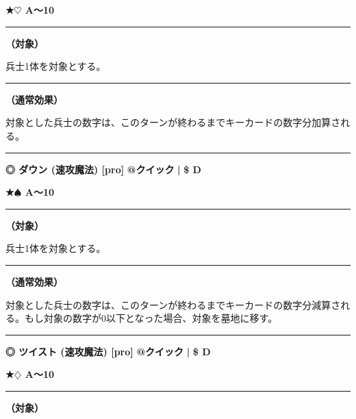 \documentclass[twocolumn,a5paper,papersize,10pt]{jarticle}
\begin{document}
{\footnotesize\bf ★{\normalsize $\heartsuit$} A〜10}

\vspace{1mm}%
\hrule height 0.1mm depth 0mm width 66.5mm %
\vspace{1mm}%
{\bf（対象）}

兵士1体を対象とする。
\vspace{1mm}%
\hrule height 0.1mm depth 0mm width 66.5mm %
\vspace{1mm}%

{\bf（通常効果）}

対象とした兵士の数字は、このターンが終わるまでキーカードの数字分加算される。
\vspace{2mm} %
\hrule height 0.5mm depth 0mm width 66.5mm %
\vspace{1mm} %
{\small\bf ◎ ダウン {\scriptsize (速攻魔法) [pro]}} %
\hfill 
{\footnotesize\bf @クイック }
  {\footnotesize\bf | } {\footnotesize\bf \$ D}

{\footnotesize\bf ★{\normalsize $\spadesuit$} A〜10}

\vspace{1mm}%
\hrule height 0.1mm depth 0mm width 66.5mm %
\vspace{1mm}%
{\bf（対象）}

兵士1体を対象とする。
\vspace{1mm}%
\hrule height 0.1mm depth 0mm width 66.5mm %
\vspace{1mm}%

{\bf（通常効果）}

対象とした兵士の数字は、このターンが終わるまでキーカードの数字分減算される。もし対象の数字が0以下となった場合、対象を墓地に移す。
\vspace{2mm} %
\hrule height 0.5mm depth 0mm width 66.5mm %
\vspace{1mm} %
{\small\bf ◎ ツイスト {\scriptsize (速攻魔法) [pro]}} %
\hfill 
{\footnotesize\bf @クイック }
  {\footnotesize\bf | } {\footnotesize\bf \$ D}

{\footnotesize\bf ★{\normalsize $\diamondsuit$} A〜10}

\vspace{1mm}%
\hrule height 0.1mm depth 0mm width 66.5mm %
\vspace{1mm}%
{\bf（対象）}
\end{document}
